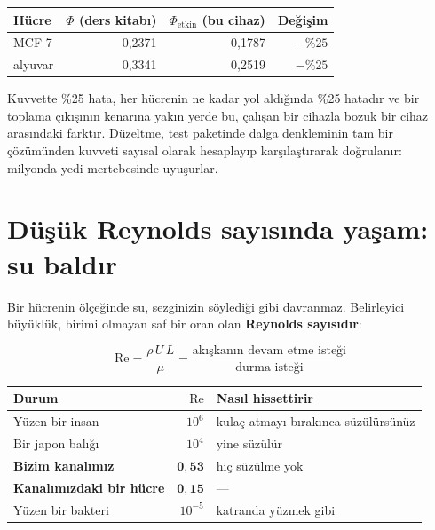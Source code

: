 \documentclass[11pt,a4paper]{article}
\begin{document}
\begin{center}\small
\begin{tabular}{lrrr}
\toprule
\textbf{Hücre} & $\Phi$ \textbf{(ders kitabı)} & $\Phi_{\text{etkin}}$ \textbf{(bu cihaz)} & \textbf{Değişim} \\
\midrule
MCF-7 & 0,2371 & 0,1787 & $-\%25$ \\
alyuvar & 0,3341 & 0,2519 & $-\%25$ \\
\bottomrule
\end{tabular}
\end{center}

Kuvvette \%25 hata, her hücrenin ne kadar yol aldığında \%25 hatadır ve bir
toplama çıkışının kenarına yakın yerde bu, çalışan bir cihazla bozuk bir cihaz
arasındaki farktır. Düzeltme, test paketinde dalga denkleminin tam bir
çözümünden kuvveti sayısal olarak hesaplayıp karşılaştırarak doğrulanır: milyonda
yedi mertebesinde uyuşurlar.

\section{Düşük Reynolds sayısında yaşam: su baldır}
\label{sec:lowre}

Bir hücrenin ölçeğinde su, sezginizin söylediği gibi davranmaz. Belirleyici
büyüklük, birimi olmayan saf bir oran olan \textbf{Reynolds sayısıdır}:

\begin{equation}
\mathrm{Re} = \frac{\rho\, U\, L}{\mu}
= \frac{\text{akışkanın devam etme isteği}}{\text{durma isteği}}
\end{equation}

\begin{center}\small
\begin{tabular}{lr>{\raggedright\arraybackslash}p{7.1cm}}
\toprule
\textbf{Durum} & $\mathrm{Re}$ & \textbf{Nasıl hissettirir} \\
\midrule
Yüzen bir insan & $10^{6}$ & kulaç atmayı bırakınca süzülürsünüz \\
Bir japon balığı & $10^{4}$ & yine süzülür \\
\textbf{Bizim kanalımız} & $\mathbf{0{,}53}$ & hiç süzülme yok \\
\textbf{Kanalımızdaki bir hücre} & $\mathbf{0{,}15}$ & --- \\
Yüzen bir bakteri & $10^{-5}$ & katranda yüzmek gibi \\
\bottomrule
\end{tabular}
\end{center}
\end{document}
